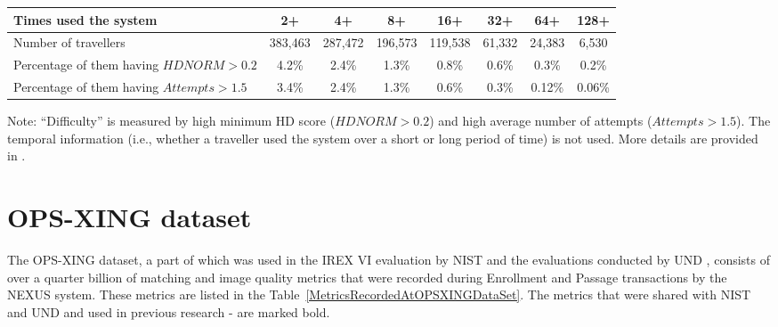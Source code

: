 \documentclass{cta-author}%
\begin{document}
\begin{table}[!b]
{

{\footnotesize 	
\begin{tabular}{|l|c|c|c|c|c|c|c|}
\hline
Times used the system & 2+ & 4+ & 8+ & 16+ & 32+ & 64+ & 128+\\
\hline
Number of travellers & 383,463 & 287,472 & 196,573 & 119,538 & 61,332 & 24,383 & 6,530\\
\hline
Percentage of them having $HDNORM>0.2$   & 4.2\% & 2.4\% & 1.3\% & 0.8\% & 0.6\% & 0.3\% & 0.2\%\\
Percentage of them having $Attempts>1.5$ & 3.4\% & 2.4\% & 1.3\% & 0.6\% & 0.3\% & 0.12\% & 0.06\%\\
\hline
\end{tabular}
}

}{}


{\footnotesize Note: 
``Difficulty'' is measured by high minimum HD score ($HDNORM>0.2$)  and high average number of attempts ($Attempts > 1.5$). 
The temporal information (i.e., whether a traveller used the system over a short or long period of time) is not used.
More details are provided in \cite{GorodnichyARTinABC}.
}

\end{table}



\section{OPS-XING dataset}
\label{sOPSXING}

The OPS-XING dataset,  a part of which was used in the IREX VI evaluation by NIST \cite{irexVI,Grother2015-iet} and the evaluations conducted by UND \cite{Bowyer2015-iet,Bowyer2015-cvpr,Bowyer-BTAS2016},
consists of over a quarter billion  of 
matching and image quality metrics that were recorded during Enrollment and Passage transactions
by the NEXUS system. 
These metrics are listed in the Table~\ref{MetricsRecordedAtOPSXINGDataSet}.
The  metrics that were shared with NIST and UND and used in previous research \cite{irexVI}-\cite{Bowyer-BTAS2016} are marked bold.
\end{document}
